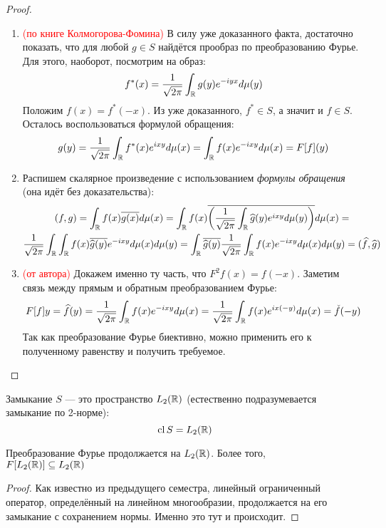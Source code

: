 \begin{proof}~
	\begin{enumerate}
		\item \textcolor{red}{(по книге Колмогорова-Фомина)} В силу уже доказанного факта, достаточно показать, что для любой $g \in S$ найдётся прообраз по преобразованию Фурье. Для этого, наоборот, посмотрим на образ:
		\[
			f^*(x) = \frac{1}{\sqrt{2\pi}}\int_{\mathbb{R}} g(y)e^{-iyx}d\mu(y)
		\]
		Положим $f(x) = f^*(-x)$. Из уже доказанного, $f^* \in S$, а значит и $f \in S$. Осталось воспользоваться формулой обращения:
		\[
			g(y) = \frac{1}{\sqrt{2\pi}}\int_{\mathbb{R}} f^*(x)e^{ixy}d\mu(x) = \int_{\mathbb{R}} f(x)e^{-ixy}d\mu(x) = F[f](y)
		\]
		
		\item Распишем скалярное произведение с использованием \textit{формулы обращения} (она идёт без доказательства):
		\begin{multline*}
			(f, g) = \int_{\mathbb{R}} f(x)\overline{g(x)}d\mu(x) = \int_{\mathbb{R}} f(x)\overline{\left(\frac{1}{\sqrt{2\pi}}\int_{\mathbb{R}} \widehat{g}(y)e^{ixy}d\mu(y)\right)}d\mu(x) =
			\\
			\frac{1}{\sqrt{2\pi}}\int_{\mathbb{R}} \int_{\mathbb{R}} f(x)\overline{\widehat{g}(y)}e^{-ixy}d\mu(x)d\mu(y) = \int_{\mathbb{R}} \overline{\widehat{g}(y)} \frac{1}{\sqrt{2\pi}}\int_{\mathbb{R}} f(x)e^{-ixy}d\mu(x)d\mu(y) = (\widehat{f}, \widehat{g})
		\end{multline*}
		
		\item \textcolor{red}{(от автора)} Докажем именно ту часть, что $F^2f(x) = f(-x)$. Заметим связь между прямым и обратным преобразованием Фурье:
		\[
			F[f]y = \widehat{f}(y) = \frac{1}{\sqrt{2\pi}}\int_{\mathbb{R}} f(x)e^{-ixy}d\mu(x) = \frac{1}{\sqrt{2\pi}}\int_{\mathbb{R}} f(x)e^{ix(-y)}d\mu(x) = \check{f}(-y)
		\]
		Так как преобразование Фурье биективно, можно применить его к полученному равенству и получить требуемое.
	\end{enumerate}
\end{proof}

\begin{reminder}
	Замыкание $S$ --- это пространство $L_2(\mathbb{R})$ (естественно подразумевается замыкание по 2-норме):
	\[
	\operatorname{cl} S = L_2(\mathbb{R})
	\]
\end{reminder}

\begin{proposition}
	Преобразование Фурье продолжается на $L_2(\mathbb{R})$. Более того, \\ $F[L_2(\mathbb{R})] \subseteq L_2(\mathbb{R})$
\end{proposition}

\begin{proof}
	Как известно из предыдущего семестра, линейный ограниченный оператор, определённый на линейном многообразии, продолжается на его замыкание с сохранением нормы. Именно это тут и происходит.
\end{proof}

